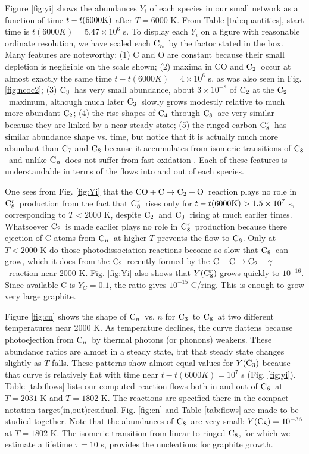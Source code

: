 \documentclass[manuscript]{aastex}
\newcommand{\ctwo}{{\rm C}_2}
\newcommand{\cthree}{{\rm C}_3}
\newcommand{\cfour}{{\rm C}_4}
\newcommand{\csix}{{\rm C}_6}
\newcommand{\cseven}{{\rm C}_7}
\newcommand{\ceight}{{\rm C}_8}
\newcommand{\ceightr}{{\rm C}_8^r}
\newcommand{\cenn}{{\rm C}_n}
\newcommand{\twoctoctwo}{${\rm C} + {\rm C} \to \ctwo + \gamma$}
\newcommand{\coctoctwo}{${\rm CO} + {\rm C} \to \ctwo + {\rm O}$}
\begin{document}
Figure \ref{fig:yi}
shows the abundances $Y_i$ of each species in our small network as a
function of time $t-t(6000 {\rm K})$ after $T=6000$ K.
From Table \ref{tab:quantities},
start time is $t(6000K) =5.47 \times 10^6$ s.
To display each $Y_i$ on a figure with
reasonable ordinate resolution, we have scaled each $\cenn$\ by the factor
stated in the box. Many features are noteworthy: (1) C and O are constant
because their small depletion is negligible on the scale shown;
(2) maxima in CO and $\ctwo$\ occur at almost exactly the same time
$t-t(6000K)= 4 \times 10^6$ s, as was also seen in Fig. \ref{fig:ncoc2};
(3) $\cthree$\ has very small abundance, about $3 \times 10^{-8}$ of $\ctwo$
at the $\ctwo$\ maximum, although much later $\cthree$\ slowly grows modestly
relative to much more abundant $\ctwo$; (4) the rise shapes of $\cfour$
through $\ceight$\ are very similar because they are linked by a near steady
state; (5) the ringed carbon $\ceightr$\ has similar abundance shape vs. time,
but notice that it is actually much more abundant than $\cseven$ and
$\ceight$ because it accumulates from isomeric transitions of $\ceight$\
and unlike $\cenn$\ does not
suffer from fast oxidation \citep{1999Sci...283.1290C}. Each of these
features is understandable in terms of the flows into and out of each species. 

One sees from Fig. \ref{fig:Yi} that the \coctoctwo\ reaction plays no
role in $\ceightr$\ production from the fact that $\ceightr$\ rises only for
$t - t(6000 {\rm K}) > 1.5 \times 10^7$ s, corresponding to $T < 2000$ K,
despite $\ctwo$\ and $\cthree$\ rising at much earlier times.
Whatsoever $\ctwo$\ is made earlier plays no role in $\ceightr$\ production
because there ejection of C atoms from $\cenn$\ at higher $T$ prevents the
flow to $\ceight$.  Only at $T < 2000$ K do those photodissociation reactions
become so slow that $\ceight$\ can grow, which it does from the $\ctwo$\
recently
formed by the \twoctoctwo\ reaction near 2000 K.  Fig. \ref{fig:Yi} also shows
that $Y(\ceightr)$
grows quickly to $10^{-16}$.  Since available C is $Y_C = 0.1$,
the ratio gives $10^{-15}$ C/ring.  This is enough to grow very large
graphite.

Figure \ref{fig:cn} shows the shape of $\cenn$\ vs. $n$ for $\cthree$\ to
$\ceight$\ at two different temperatures near 2000 K. As temperature declines,
the curve flattens because photoejection from $\cenn$\ by thermal photons
(or phonons) weakens. These abundance ratios are almost in a steady state,
but that steady state changes slightly as $T$ falls. These patterns show
almost equal values for $Y(\cthree)$ because that curve is relatively flat
with time near $t-t(6000K) = 10^7$ s (Fig. \ref{fig:yi}).
Table \ref{tab:flows} lists our computed reaction flows both in and out of
$\csix$\ at $T = 2031$ K and $T = 1802$ K.
The reactions are specified there in the
compact notation target(in,out)residual. Fig. \ref{fig:cn} and
Table \ref{tab:flows} are made to be studied together.
Note that the abundances of $\ceight$\ are very small:
$Y(\ceight)= 10^{-36}$ at $T = 1802$ K.
The isomeric transition from linear to
ringed $\ceight$, for which we estimate a lifetime $\tau = 10$ s,
provides the nucleations for graphite growth.
\end{document}
